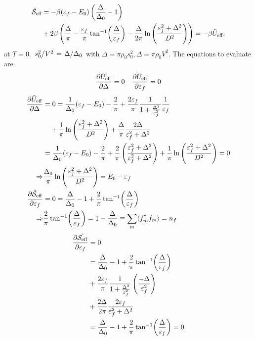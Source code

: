 \begin{align}
\begin{split}
	\tilde{\mathcal{S}}_{\text{eff}}&= -\beta(\varepsilon_f -E_0)\left(\frac{\Delta}{\Delta_0}-1\right) \\
	\quad &+2\beta\left(\frac{\Delta}{\pi} - \frac{\varepsilon_f}{\pi}\tan[-1](\frac{\Delta}{\varepsilon_f}) - \frac{\Delta}{2\pi}\ln\left(\frac{\varepsilon_f^2 + \Delta^2}{D^2}\right)\right) =-\beta\tilde{U}_\text{eff},
\end{split}
\end{align}
at $T = 0$. $\flatfrac{s_0^2}{V^2} = \flatfrac{\Delta}{\Delta_0}$ with $\Delta = \pi\rho_0 s_0^2, \Delta = \pi\rho_0 V^2$.
The equations to evaluate are
\begin{align*}
	\pdv{\tilde{U}_\text{eff}}{\Delta} = 0 &&
	\pdv{\tilde{U}_\text{eff}}{\varepsilon_f} = 0
\end{align*}
\begin{align*}
\pdv{\tilde{U}_\text{eff}}{\Delta} &= 0 = \frac{1}{\Delta_0}(\varepsilon_f - E_0) - \frac{2}{\pi} + \frac{2\varepsilon_f}{\pi}\frac{1}{1+\frac{\Delta^2}{\varepsilon_f^2}}\frac{1}{\varepsilon_f} \\
&\quad+ \frac{1}{\pi}\ln\left(\frac{\varepsilon_f^2 +\Delta^2}{D^2}\right) + \frac{\Delta}{\pi}\frac{2\Delta}{\varepsilon_f^2 + \Delta^2} \\
&= \frac{1}{\Delta_0}(\varepsilon_f-E_0)-\frac{2}{\pi} + \frac{2}{\pi}\left(\frac{\varepsilon_f^2 + \Delta^2}{\varepsilon_f^2+\Delta^2}\right) + \frac{1}{\pi}\ln\left(\frac{\varepsilon_f^2 +\Delta^2}{D^2}\right) = 0  \\
\Rightarrow &\frac{\Delta_0}{\pi}\ln\left(\frac{\varepsilon_f^2 + \Delta^2}{D^2}\right) = E_0 - \varepsilon_f \\
\pdv{\tilde{\mathcal{S}}_{\text{eff}}}{\varepsilon_f} &= 0 = \frac{\Delta}{\Delta_0} -1 +\frac{2}{\pi}\tan[-1](\frac{\Delta}{\varepsilon_f}) \\
\Rightarrow &
\frac{2}{\pi}\tan[-1](\frac{\Delta}{\varepsilon_f}) = 1-\frac{\Delta}{\Delta_0} \equiv \sum_m\langle f_m^\dagger f_m\rangle = n_f
\end{align*}
\begin{align*}
\pdv{\tilde{\mathcal{S}_{\text{eff}}}}{\varepsilon_f} &= 0 \\
&=\frac{\Delta}{\Delta_0} - 1+\frac{2}{\pi}\tan[-1](\frac{\Delta}{\varepsilon_f}) \\
\quad &+ \frac{2\varepsilon_f}{\pi}\frac{1}{1+\frac{\Delta^2}{\varepsilon_f^2}}\left(\frac{-\Delta}{\varepsilon_f^2}\right) \\
\quad &+ \frac{2\Delta}{2\pi}\frac{2\varepsilon_f}{\varepsilon_f^2 + \Delta^2} \\
&= \frac{\Delta}{\Delta_0} -1 +\frac{2}{\pi}\tan[-1](\frac{\Delta}{\varepsilon_f}) = 0
\end{align*}
